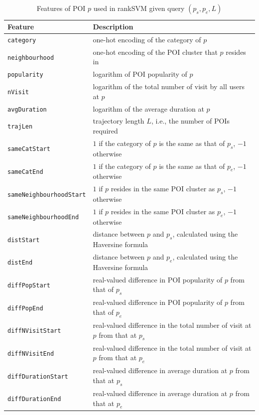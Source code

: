 \begin{table}[t]
\caption{Features of POI $p$ used in rankSVM given query $(p_s, p_e, L)$}
\label{tab:featurerank}
\centering
\begin{tabular}{l|l} \hline
\textbf{Feature}  & \textbf{Description} \\ \hline
\texttt{category}               & one-hot encoding of the category of $p$ \\
\texttt{neighbourhood}          & one-hot encoding of the POI cluster that $p$ resides in \\
\texttt{popularity}             & logarithm of POI popularity of $p$ \\
\texttt{nVisit}                 & logarithm of the total number of visit by all users at $p$ \\
\texttt{avgDuration}            & logarithm of the average duration at $p$ \\ \hline
\texttt{trajLen}                & trajectory length $L$, i.e., the number of POIs required \\
\texttt{sameCatStart}           & $1$ if the category of $p$ is the same as that of $p_s$, $-1$ otherwise \\
\texttt{sameCatEnd}             & $1$ if the category of $p$ is the same as that of $p_e$, $-1$ otherwise \\
\texttt{sameNeighbourhoodStart} & $1$ if $p$ resides in the same POI cluster as $p_s$, $-1$ otherwise \\
\texttt{sameNeighbourhoodEnd}   & $1$ if $p$ resides in the same POI cluster as $p_e$, $-1$ otherwise \\
\texttt{distStart}              & distance between $p$ and $p_s$, calculated using the Haversine formula \\
\texttt{distEnd}                & distance between $p$ and $p_e$, calculated using the Haversine formula \\
\texttt{diffPopStart}           & real-valued difference in POI popularity of $p$ from that of $p_s$ \\
\texttt{diffPopEnd}             & real-valued difference in POI popularity of $p$ from that of $p_e$ \\
\texttt{diffNVisitStart}        & real-valued difference in the total number of visit at $p$ from that at $p_s$ \\
\texttt{diffNVisitEnd}          & real-valued difference in the total number of visit at $p$ from that at $p_e$ \\
\texttt{diffDurationStart}      & real-valued difference in average duration at $p$ from that at $p_s$ \\
\texttt{diffDurationEnd}        & real-valued difference in average duration at $p$ from that at $p_e$ \\ \hline
\end{tabular}
\end{table}


